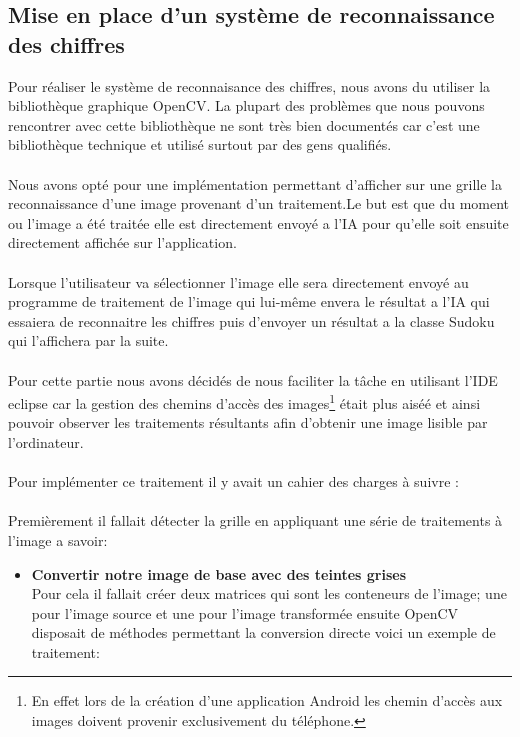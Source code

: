 \documentclass{article}
\begin{document}
\subsection{Mise en place d'un système de reconnaissance des chiffres}
Pour réaliser le système de reconnaisance des chiffres, nous avons du utiliser la bibliothèque graphique OpenCV.
La plupart des problèmes que nous pouvons rencontrer avec cette bibliothèque ne sont très bien documentés car c'est une bibliothèque technique et utilisé surtout par des gens qualifiés.\\\\
Nous avons opté pour une implémentation permettant d'afficher sur une grille la reconnaissance d'une image provenant d'un traitement.Le but est que du moment ou l'image a été traitée elle est directement envoyé a l'IA pour qu'elle soit ensuite directement affichée sur l'application.\\\\
Lorsque l'utilisateur va sélectionner l'image elle sera directement envoyé au programme de traitement de l'image qui lui-même envera le résultat a l'IA qui essaiera de reconnaitre les chiffres puis d'envoyer un résultat a la classe Sudoku qui l'affichera par la suite.\\\\
Pour cette partie nous avons décidés de nous faciliter la tâche en utilisant l'IDE eclipse car la gestion des chemins d'accès des images\footnote{En effet lors de la création d'une application Android les chemin d'accès aux images doivent provenir exclusivement du téléphone.} était plus aiséé et ainsi pouvoir observer les traitements résultants afin d'obtenir une image lisible par l'ordinateur.\\
\\
Pour implémenter ce traitement il y avait un cahier des charges à suivre :\\\\
Premièrement il fallait détecter la grille en appliquant une série de traitements à l'image a savoir:
\begin{itemize}
    \item \textbf{Convertir notre image de base avec des teintes grises}\\
    Pour cela il fallait créer deux matrices qui sont les conteneurs de l'image; une pour l'image source et une pour l'image transformée ensuite OpenCV disposait de méthodes permettant la conversion directe voici un exemple de traitement:\\
    \end{itemize}
\end{document}
